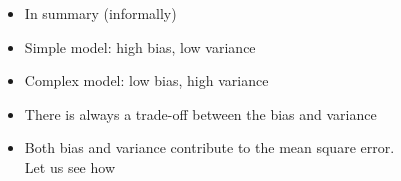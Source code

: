 \begin{frame}
\begin{columns}
\begin{column}{0.4\textwidth}
\begin{figure}
				\caption{}
				\label{fig:simpl}
			\end{figure}
		\end{column}
		\begin{column}{0.6\textwidth}
			\begin{itemize}
				\justifying
				\item<1-> In summary (informally)
				\item<2-> Simple model: high bias, low variance					
				\item<3-> Complex model: low bias, high variance
				\item<4-> There is always a trade-off between the bias and variance
				\item<5-> Both bias and variance contribute to the mean square error. Let us see how
			\end{itemize}
		\end{column}
	\end{columns}
\end{frame}
